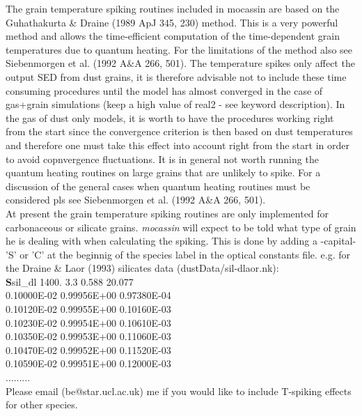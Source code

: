 \documentclass[11pt]{article}
\begin{document}
   The grain temperature spiking routines included in {\sc mocassin} are based on the Guhathakurta \& Draine (1989 ApJ 345, 230) method. This is a very powerful method and allows the time-efficient computation of the time-dependent grain temperatures due to quantum heating. For the limitations of the method also see Siebenmorgen et al. (1992 A\&A 266, 501). The temperature spikes only affect the output SED from dust grains, it is therefore advisable not to include these time consuming procedures until the model has almost converged in the case of gas+grain simulations (keep a high value of real2 - see keyword description). In the gas of dust only models, it is worth to have the procedures working right from the start since the convergence criterion is then based on dust temperatures and therefore one must take this effect into account right from the start in order to avoid copnvergence fluctuations. It is in general not worth running the quantum heating routines on large grains that are unlikely to spike. For a discussion of the general cases when quantum heating routines must be considered pls see Siebenmorgen et al. (1992 A\&A 266, 501). \\

At present the grain temperature spiking routines are only implemented for carbonaceous or silicate grains. {\it mocassin} will expect to be told what type of grain he is dealing with when calculating the spiking. This is done by adding a -capital- 'S' or 'C' at the beginnig of the species label in the optical constants file. e.g. for the Draine \& Laor (1993) silicates data (dustData/sil-dlaor.nk): \\
 {\bf S}sil\_dl  1400. 3.3  0.588 20.077\\
 0.10000E-02 0.99956E+00 0.97380E-04\\
 0.10120E-02 0.99955E+00 0.10160E-03\\
 0.10230E-02 0.99954E+00 0.10610E-03\\
 0.10350E-02 0.99953E+00 0.11060E-03\\
 0.10470E-02 0.99952E+00 0.11520E-03\\
 0.10590E-02 0.99951E+00 0.12000E-03\\
 .........\\
Please email (be@star.ucl.ac.uk) me if you would like to include T-spiking effects for other species. \\



\pagebreak

\\
\end{document}
